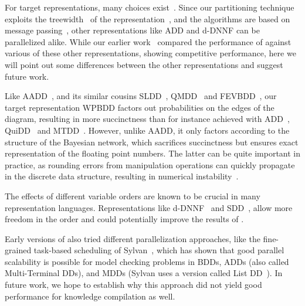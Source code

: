 For target representations, many choices exist~\cite{chavira2008probabilistic,darwiche2011sdd,choi2022fpga}. Since our partitioning technique exploits the treewidth~\cite{chen2022definition} of the representation~\cite[\S 5]{dal2021compositional}, and the algorithms are based on message passing~\cite[\S 4]{dal2021compositional}, other representations like ADD and d-DNNF can be parallelized alike. While our earlier work~\cite{dal2018parallel} compared the performance of \toolname against various of these other representations, showing competitive performance, here we will point out some differences between the other representations and suggest future work.


Like AADD~\cite{sanner2005affine}, and its similar cousins SLDD~\cite{wilson2005decision}, QMDD~\cite{miller2006qmdd} and FEVBDD~\cite{tafertshofer1997factored}, our target representation WPBDD factors out probabilities on the edges of the diagram, resulting in more succinctness than for instance achieved with ADD~\cite{bahar}, QuiDD~\cite{viamontes2003improving} and MTDD~\cite{Clarke2001}. However, unlike AADD, it only factors according to the structure of the Bayesian network, which sacrifices succinctness but ensures exact representation of the floating point numbers. The latter can be quite important in practice, as rounding errors from manipulation operations can quickly propagate in the discrete data structure, resulting in numerical instability~\cite{zulehner2019efficiently,peham2022equivalence,hillmich2022reordering}.


The effects of different variable orders are known to be crucial in many representation languages. Representations like d-DNNF~\cite{chavira2008probabilistic} and SDD~\cite{darwiche2011sdd}, allow more freedom in the order and could potentially improve the results of \toolname.

Early versions of \toolname also tried different parallelization approaches, like the fine-grained task-based scheduling of Sylvan~\cite{van2013multi}, which has shown that good parallel scalability is possible for model checking problems in BDDs, ADDs (also called Multi-Terminal DDs), and MDDs (Sylvan uses a version called List DD~\cite{sylvan-journal}). In future work, we hope to establish why this approach did not yield good performance for knowledge compilation as well.




